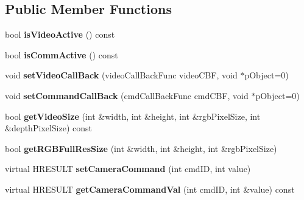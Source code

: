\subsection*{Public Member Functions}
\begin{DoxyCompactItemize}
\item 
\hypertarget{classTDVCameraInterfaceBase_ae9e01cf3dc1a73620a056cc34586898a}{
bool {\bfseries isVideoActive} () const }
\label{classTDVCameraInterfaceBase_ae9e01cf3dc1a73620a056cc34586898a}

\item 
\hypertarget{classTDVCameraInterfaceBase_a21f0b98fc8fe110fa69de4f4d766a488}{
bool {\bfseries isCommActive} () const }
\label{classTDVCameraInterfaceBase_a21f0b98fc8fe110fa69de4f4d766a488}

\item 
\hypertarget{classTDVCameraInterfaceBase_ae371fdab81d2896f4d725a62c4157f5f}{
void {\bfseries setVideoCallBack} (videoCallBackFunc videoCBF, void $\ast$pObject=0)}
\label{classTDVCameraInterfaceBase_ae371fdab81d2896f4d725a62c4157f5f}

\item 
\hypertarget{classTDVCameraInterfaceBase_aecf920692d98daac41e09f597e1d32d5}{
void {\bfseries setCommandCallBack} (cmdCallBackFunc cmdCBF, void $\ast$pObject=0)}
\label{classTDVCameraInterfaceBase_aecf920692d98daac41e09f597e1d32d5}

\item 
\hypertarget{classTDVCameraInterfaceBase_aab7ffba266ac2d0c1a20694cab5953e7}{
bool {\bfseries getVideoSize} (int \&width, int \&height, int \&rgbPixelSize, int \&depthPixelSize) const }
\label{classTDVCameraInterfaceBase_aab7ffba266ac2d0c1a20694cab5953e7}

\item 
\hypertarget{classTDVCameraInterfaceBase_a6338dae33c7e3c4184161944832e9d99}{
bool {\bfseries getRGBFullResSize} (int \&width, int \&height, int \&rgbPixelSize)}
\label{classTDVCameraInterfaceBase_a6338dae33c7e3c4184161944832e9d99}

\item 
\hypertarget{classTDVCameraInterfaceBase_abc48f94311e7aadf0c6a0df157951097}{
virtual HRESULT {\bfseries setCameraCommand} (int cmdID, int value)}
\label{classTDVCameraInterfaceBase_abc48f94311e7aadf0c6a0df157951097}

\item 
\hypertarget{classTDVCameraInterfaceBase_a136acd03b9cf0e8ee17af7679721d82a}{
virtual HRESULT {\bfseries getCameraCommandVal} (int cmdID, int \&value) const }
\label{classTDVCameraInterfaceBase_a136acd03b9cf0e8ee17af7679721d82a}


\end{DoxyCompactItemize}
